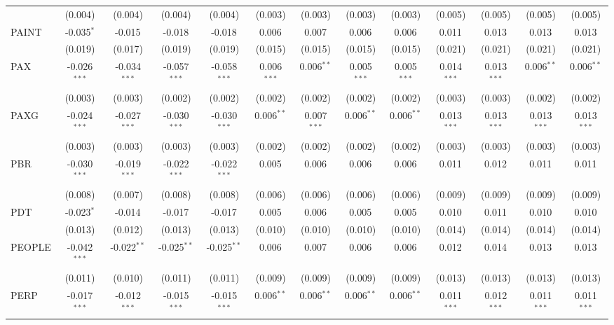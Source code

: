 \begin{table}[!htbp]
\begin{tabular}{@{\extracolsep{5pt}}lcccccccccccc}
  & (0.004) & (0.004) & (0.004) & (0.004) & (0.003) & (0.003) & (0.003) & (0.003) & (0.005) & (0.005) & (0.005) & (0.005) \\
 PAINT & -0.035$^{*}$ & -0.015$^{}$ & -0.018$^{}$ & -0.018$^{}$ & 0.006$^{}$ & 0.007$^{}$ & 0.006$^{}$ & 0.006$^{}$ & 0.011$^{}$ & 0.013$^{}$ & 0.013$^{}$ & 0.013$^{}$ \\
  & (0.019) & (0.017) & (0.019) & (0.019) & (0.015) & (0.015) & (0.015) & (0.015) & (0.021) & (0.021) & (0.021) & (0.021) \\
 PAX & -0.026$^{***}$ & -0.034$^{***}$ & -0.057$^{***}$ & -0.058$^{***}$ & 0.006$^{***}$ & 0.006$^{**}$ & 0.005$^{***}$ & 0.005$^{***}$ & 0.014$^{***}$ & 0.013$^{***}$ & 0.006$^{**}$ & 0.006$^{**}$ \\
  & (0.003) & (0.003) & (0.002) & (0.002) & (0.002) & (0.002) & (0.002) & (0.002) & (0.003) & (0.003) & (0.002) & (0.002) \\
 PAXG & -0.024$^{***}$ & -0.027$^{***}$ & -0.030$^{***}$ & -0.030$^{***}$ & 0.006$^{**}$ & 0.007$^{***}$ & 0.006$^{**}$ & 0.006$^{**}$ & 0.013$^{***}$ & 0.013$^{***}$ & 0.013$^{***}$ & 0.013$^{***}$ \\
  & (0.003) & (0.003) & (0.003) & (0.003) & (0.002) & (0.002) & (0.002) & (0.002) & (0.003) & (0.003) & (0.003) & (0.003) \\
 PBR & -0.030$^{***}$ & -0.019$^{***}$ & -0.022$^{***}$ & -0.022$^{***}$ & 0.005$^{}$ & 0.006$^{}$ & 0.006$^{}$ & 0.006$^{}$ & 0.011$^{}$ & 0.012$^{}$ & 0.011$^{}$ & 0.011$^{}$ \\
  & (0.008) & (0.007) & (0.008) & (0.008) & (0.006) & (0.006) & (0.006) & (0.006) & (0.009) & (0.009) & (0.009) & (0.009) \\
 PDT & -0.023$^{*}$ & -0.014$^{}$ & -0.017$^{}$ & -0.017$^{}$ & 0.005$^{}$ & 0.006$^{}$ & 0.005$^{}$ & 0.005$^{}$ & 0.010$^{}$ & 0.011$^{}$ & 0.010$^{}$ & 0.010$^{}$ \\
  & (0.013) & (0.012) & (0.013) & (0.013) & (0.010) & (0.010) & (0.010) & (0.010) & (0.014) & (0.014) & (0.014) & (0.014) \\
 PEOPLE & -0.042$^{***}$ & -0.022$^{**}$ & -0.025$^{**}$ & -0.025$^{**}$ & 0.006$^{}$ & 0.007$^{}$ & 0.006$^{}$ & 0.006$^{}$ & 0.012$^{}$ & 0.014$^{}$ & 0.013$^{}$ & 0.013$^{}$ \\
  & (0.011) & (0.010) & (0.011) & (0.011) & (0.009) & (0.009) & (0.009) & (0.009) & (0.013) & (0.013) & (0.013) & (0.013) \\
 PERP & -0.017$^{***}$ & -0.012$^{***}$ & -0.015$^{***}$ & -0.015$^{***}$ & 0.006$^{**}$ & 0.006$^{**}$ & 0.006$^{**}$ & 0.006$^{**}$ & 0.011$^{***}$ & 0.012$^{***}$ & 0.011$^{***}$ & 0.011$^{***}$ \\

\end{tabular}
\end{table}
